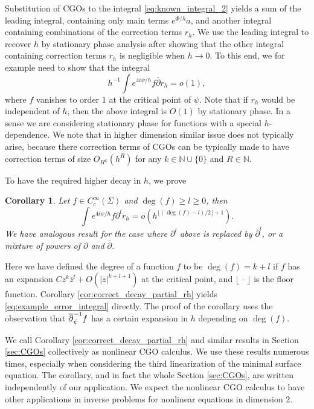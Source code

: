 \documentclass[12pt]{amsart}
\def\p{\partial}
\def\N{\mathbb N}
\newtheorem{corollary}[theorem]{Corollary}
\theoremstyle{definition}
\theoremstyle{remark}
\newcommand{\abs}[1]{\lvert #1 \rvert}
\newcommand{\s}{\hspace{0.5pt}}
\newcommand{\op}{\overline \p}
\newcommand{\ccdot}{\,\cdot\,}
\begin{document}
Substitution of CGOs to the integral \eqref{eq:known_integral_2} yields a sum of the leading integral, containing only main terms $e^{\Phi/h}a$, and another integral containing combinations of the correction terms $r_h$. 
We use the leading integral to recover $h$ by stationary phase analysis after showing that the other integral containing correction terms $r_h$ is negligible when $h\to 0$. To this end, we for example need to show that
the integral
\begin{equation}\label{eq:example_error_integral}
 h^{-1}\int e^{4i\psi/h}f\op r_h=o(1),
\end{equation}
where $f$ vanishes to order $1$ at the critical point of $\psi$. Note that if $r_h$ would be independent of $h$, then the above integral is $O(1)$ by stationary phase. In a sense we are considering stationary phase for functions with a special $h$-dependence. We note that in higher dimension similar issue does not typically arise, because there correction terms of CGOs can be typically made to have correction terms of size $O_{H^k}(h^R)$ for any $k\in \N\cup \{0\}$ and $R\in \N$.

To have the required higher decay in $h$, we prove 
\begin{corollary}%
 Let $f\in C_c^\infty(\Sigma)$ and $\deg(f)\geq l\geq 0$,  then 
 \[
  \int e^{4i\psi/h}f \p^l r_h=o(h^{\lfloor (\deg(f)-l)/2\rfloor +1}).
 \]
 We have analogous result for the case where $\p^l$ above is replaced by $\op^l$, or a mixture of powers of $\p$ and $\op$.
\end{corollary}
% 
Here we have defined the degree of a function $f$ to be $\deg(f)=k+l$ if $f$ has an expansion $Cz^k\overline z^l+O(\abs{z}^{k+l+1})$ at the critical point, and $\lfloor\ccdot \rfloor$ is the floor function. Corollary \ref{cor:correct_decay_partial_rh} yields  \eqref{eq:example_error_integral} directly. The proof of the corollary uses the observation that $\overline \p_{\psi}^{\s -1}f$ has a certain expansion in $h$ depending on $\deg(f)$.

We call Corollary \ref{cor:correct_decay_partial_rh} and similar results in Section \ref{sec:CGOs} collectively as nonlinear CGO calculus.  We use these results numerous times, especially when considering the third linearization of the minimal surface equation. The corollary, and in fact the whole Section \ref{sec:CGOs}, are written independently of our application. We expect the nonlinear CGO calculus to have other applications in inverse problems for nonlinear equations in dimension $2$. %
\end{document}
